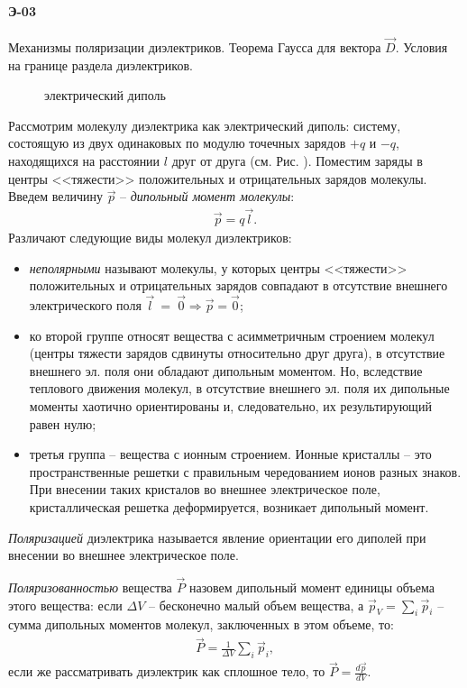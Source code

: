\documentclass[__main__.tex]{subfiles}
\begin{document}
\paragraph{Э-03}
Механизмы поляризации диэлектриков. Теорема Гаусса для вектора $\vec{D}$. Условия на границе раздела диэлектриков.\\

\begin{wrapfigure}{r}{.3\linewidth}
\centering

\caption{электрический диполь}
\end{wrapfigure}

Рассмотрим молекулу диэлектрика как электрический диполь: систему, состоящую из двух одинаковых по модулю точечных зарядов $+q$ и $-q$, находящихся на расстоянии $l$ друг от друга (см. Рис. ). Поместим заряды в центры <<тяжести>> положительных и отрицательных зарядов молекулы. Введем величину $\vec{p}$ -- \emph{дипольный момент молекулы}:
\begin{gather}
\vec{p} = q\vec{l}.
\end{gather}
Различают следующие виды молекул диэлектриков:
\begin{itemize}
\item
\emph{неполярными} называют молекулы, у которых центры <<тяжести>> положительных и отрицательных зарядов совпадают в отсутствие внешнего электрического поля $\vec{l}~=~\vec{0}\Rightarrow\vec{p}=\vec{0}$;
\item
ко второй группе относят вещества с асимметричным строением молекул (центры тяжести зарядов сдвинуты относительно друг друга), в отсутствие внешнего эл. поля они обладают дипольным моментом. Но, вследствие теплового движения молекул, в отсутствие внешнего эл. поля их дипольные моменты хаотично ориентированы и, следовательно, их результирующий равен нулю;
\item
третья группа -- вещества с ионным строением. Ионные кристаллы -- это пространственные решетки с правильным чередованием ионов разных знаков. При внесении таких кристалов во внешнее электрическое поле, кристаллическая решетка деформируется, возникает дипольный момент.
\end{itemize}

\begin{definition}
\emph{Поляризацией} диэлектрика называется явление ориентации его диполей при внесении во внешнее электрическое поле.
\end{definition}

\begin{definition}
\emph{Поляризованностью} вещества $\vec{P}$ назовем дипольный момент единицы объема этого вещества: если $\Delta V$ -- бесконечно малый объем вещества, а $\vec{p}_V = \sum_{i}\vec{p}_i$ -- сумма дипольных моментов молекул, заключенных в этом объеме, то:
\begin{gather}
\vec{P} = \frac{1}{\Delta V}\sum_{i}\vec{p}_i,
\end{gather}
если же рассматривать диэлектрик как сплошное тело, то $\vec{P}=\frac{d\vec{p}}{dV}$.
\end{definition}
\end{document}
